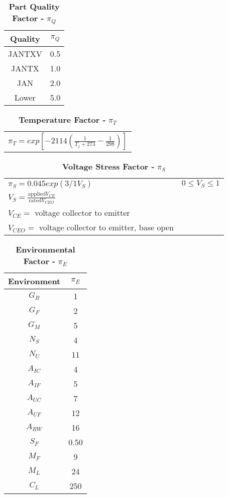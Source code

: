 \begin{table}[h]
\caption{\textbf{Part Quality Factor -} $\pi_{Q}$}
\label{table:qualityFactorRateBjtHigh}
\begin{tabular}{|c|c|} \hline
\rowcolor{Gray}
\textbf{Quality} & $\pi_{Q}$ \\ \hline
JANTXV & 0.5 \\ \hline
JANTX & 1.0 \\ \hline
JAN & 2.0 \\ \hline
Lower & 5.0 \\ \hline
\end{tabular}
\end{table}


\begin{table}[h]
\caption{\textbf{Temperature Factor -} $\pi_{T}$}
\label{table:tempFactorBjtHigh}
\begin{tabular}{l} 
$\pi_{T} = exp[-2114(\frac{1}{T_j + 273} - \frac{1}{298})]$
\end{tabular}
\end{table}


\begin{table}[h]
\caption{\textbf{Voltage Stress Factor -} $\pi_{S}$}
\label{table:voltStressFactorTransHigh}
\begin{tabular}{ll} 
$\pi_{S} = 0.045exp(3/1V_{S})$ 					& $0 \leq V_{S} \leq 1$		\\
$V_{S} = \frac{\text{applied} V_{CE}}{\text{rated} V_{CEO}}$			& 	\\
$V_{CE} =$ voltage collector to emitter								&	\\
$V_{CEO} = $ voltage collector to emitter, base open					& \\
\end{tabular}
\end{table}


\begin{table}[h]
\caption{\textbf{Environmental Factor -} $\pi_{E}$}
\label{table:enviroFactorTransHigh}
\begin{tabular}{|c|c|} \hline
\rowcolor{Gray}
\textbf{Environment} & $\pi_{E}$ \\ \hline
$G_{B}$ & 1 \\ \hline
$G_{F}$ & 2 \\ \hline
$G_{M}$ & 5 \\ \hline
$N_{S}$ & 4 \\ \hline
$N_{U}$ & 11 \\ \hline
$A_{IC}$ & 4 \\ \hline
$A_{IF}$ & 5 \\ \hline
$A_{UC}$ & 7 \\ \hline
$A_{UF}$ & 12 \\ \hline
$A_{RW}$ & 16 \\ \hline
$S_{F}$ & 0.50 \\ \hline
$M_{F}$ & 9 \\ \hline
$M_{L}$ & 24 \\ \hline
$C_{L}$ & 250 \\ \hline
\end{tabular}
\end{table}

